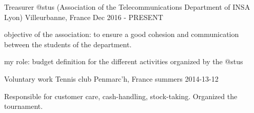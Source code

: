 

\begin{cventries}

  \cventry
    {Treasurer} %
    {@stus (Association of the Telecommunications Department of INSA Lyon)}  %
    {Villeurbanne, France} %
    {Dec 2016 - PRESENT} %
    {
      \begin{cvitems} %
        \item {objective of the association: to ensure a good cohesion and communication between the students of the department.}
        \item {my role: budget definition for the different activities organized by the @stus}
      \end{cvitems}
    }

  \cventry
    {Voluntary work} %
    {Tennis club} %
    {Penmarc'h, France} %
    {summers 2014-13-12} %
    {
      \begin{cvitems} %
        \item {Responsible for customer care, cash-handling, stock-taking. Organized the tournament.}
      \end{cvitems}
    }


\end{cventries}
